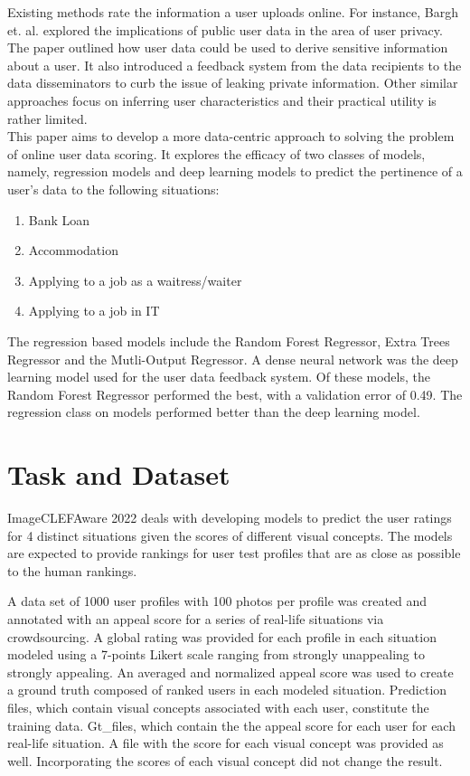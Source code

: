 \documentclass{llncs}
\begin{document}
Existing methods  rate the information a user uploads online. For instance, Bargh et. al. \cite{barghFeedbackSystem} explored the implications of public user data in the area of user privacy. The paper outlined how user data could be used to derive sensitive information about a user. It also introduced a feedback system from the data recipients to the data disseminators to curb the issue of leaking private information. Other similar approaches focus on inferring user characteristics and their practical utility is rather limited. 
\\This paper aims to develop a more data-centric approach to solving the problem of online user data scoring. It explores the efficacy of two classes of models, namely, regression models and deep learning models to predict the pertinence of a user's data to the following situations:
\begin{enumerate}
    \item Bank Loan
    \item Accommodation 
    \item Applying to a job as a waitress/waiter
    \item Applying to a job in IT
\end{enumerate} 
The regression based models include the Random Forest Regressor, Extra Trees Regressor and the Mutli-Output Regressor. A dense neural network was the deep learning model used for the user data feedback system. Of these models, the Random Forest Regressor performed the best, with a validation error of 0.49. The regression class on models performed better than the deep learning model.

\vspace{5mm}

\section{Task and Dataset}
ImageCLEFAware 2022 deals with developing models to predict the user ratings\cite{hsu2014predicting} for 4 distinct situations given the scores of different visual concepts. The models are expected to provide rankings for user test profiles that are as close as possible to the human rankings.

A data set of 1000 user profiles with 100 photos per profile was created and annotated with an appeal score for a series of real-life situations via crowdsourcing. A global rating\cite{armstrong1995movie} was provided for each profile in each situation modeled using a 7-points Likert scale ranging from strongly unappealing to strongly appealing. An averaged and normalized appeal score was used to create a ground truth composed of ranked users in each modeled situation. Prediction files, which contain visual concepts associated with each user, constitute the training data.  Gt\_files, which contain the the appeal score for each user for each real-life situation. A file with the score for each visual concept was provided as well. Incorporating the scores of each visual concept did not change the result.
\end{document}
